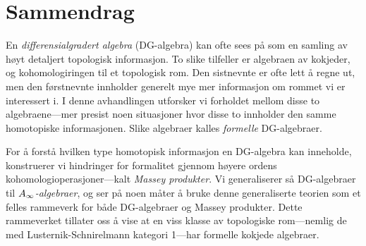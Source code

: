 

\section{Sammendrag}

En \textit{differensialgradert algebra} (DG-algebra) kan ofte sees på som en samling av høyt detaljert topologisk informasjon. To slike tilfeller er algebraen av kokjeder, og kohomologiringen til et topologisk rom. Den sistnevnte er ofte lett å regne ut, men den førstnevnte innholder generelt mye mer informasjon om rommet vi er interessert i. I denne avhandlingen utforsker vi forholdet mellom disse to algebraene---mer presist noen situasjoner hvor disse to innholder den samme homotopiske informasjonen. Slike algebraer kalles \textit{formelle} DG-algebraer. 

For å forstå hvilken type homotopisk informasjon en DG-algebra kan inneholde, konstruerer vi hindringer for formalitet gjennom høyere ordens kohomologioperasjoner---kalt \textit{Massey produkter}. Vi generaliserer så DG-algebraer til \textit{$A_{\infty}$-algebraer}, og ser på noen måter å bruke denne generaliserte teorien som et felles rammeverk for både DG-algebraer og Massey produkter. Dette rammeverket tillater oss å vise at en viss klasse av topologiske rom---nemlig de med Lusternik-Schnirelmann kategori 1---har formelle kokjede algebraer. 